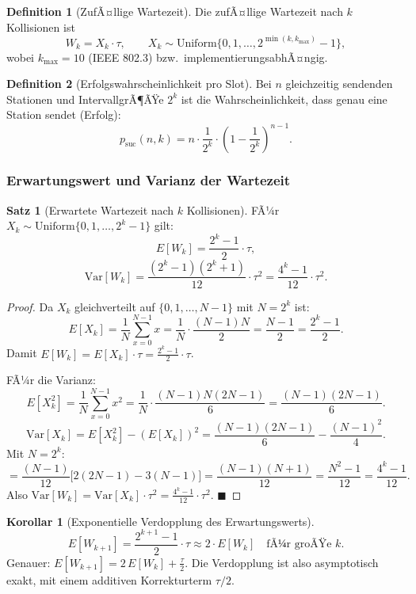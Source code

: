 ﻿\documentclass[a4paper,12pt]{article}
\theoremstyle{definition}
\newtheorem{definition}{Definition}
\newtheorem{satz}{Satz}
\newtheorem{korollar}{Korollar}
\begin{document}
\begin{definition}[ZufÃ¤llige Wartezeit]
Die zufÃ¤llige Wartezeit nach $k$ Kollisionen ist
\[
  W_k = X_k \cdot \tau, \qquad
  X_k \sim \mathrm{Uniform}\bigl\{0, 1, \ldots, 2^{\min(k,k_{\max})}-1\bigr\},
\]
wobei $k_{\max} = 10$ (IEEE 802.3) bzw.\ implementierungsabhÃ¤ngig.
\end{definition}

\begin{definition}[Erfolgswahrscheinlichkeit pro Slot]
Bei $n$ gleichzeitig sendenden Stationen und IntervallgrÃ¶ÃŸe $2^k$
ist die Wahrscheinlichkeit, dass genau eine Station sendet (Erfolg):
\[
  p_{\mathrm{suc}}(n, k) = n \cdot \frac{1}{2^k}
    \cdot \left(1 - \frac{1}{2^k}\right)^{n-1}.
\]
\end{definition}

\subsubsection{Erwartungswert und Varianz der Wartezeit}

\begin{satz}[Erwartete Wartezeit nach $k$ Kollisionen]
\label{satz:erwartung_backoff}
FÃ¼r $X_k \sim \mathrm{Uniform}\{0, 1, \ldots, 2^k - 1\}$ gilt:
\[
  E[W_k] = \frac{2^k - 1}{2} \cdot \tau,
\]
\[
  \mathrm{Var}[W_k] = \frac{(2^k - 1)(2^k + 1)}{12} \cdot \tau^2
                    = \frac{4^k - 1}{12} \cdot \tau^2.
\]
\end{satz}

\begin{proof}
Da $X_k$ gleichverteilt auf $\{0, 1, \ldots, N-1\}$ mit $N = 2^k$ ist:
\[
  E[X_k] = \frac{1}{N}\sum_{x=0}^{N-1} x
          = \frac{1}{N} \cdot \frac{(N-1)N}{2}
          = \frac{N-1}{2}
          = \frac{2^k - 1}{2}.
\]
Damit $E[W_k] = E[X_k] \cdot \tau = \frac{2^k-1}{2} \cdot \tau$.

FÃ¼r die Varianz:
\[
  E[X_k^2] = \frac{1}{N}\sum_{x=0}^{N-1} x^2
            = \frac{1}{N} \cdot \frac{(N-1)N(2N-1)}{6}
            = \frac{(N-1)(2N-1)}{6}.
\]
\[
  \mathrm{Var}[X_k]
  = E[X_k^2] - (E[X_k])^2
  = \frac{(N-1)(2N-1)}{6} - \frac{(N-1)^2}{4}.
\]
Mit $N = 2^k$:
\[
  = \frac{(N-1)}{12}\bigl[2(2N-1) - 3(N-1)\bigr]
  = \frac{(N-1)(N+1)}{12}
  = \frac{N^2 - 1}{12}
  = \frac{4^k - 1}{12}.
\]
Also $\mathrm{Var}[W_k] = \mathrm{Var}[X_k] \cdot \tau^2 = \frac{4^k-1}{12} \cdot \tau^2$.
\hfill$\blacksquare$
\end{proof}

\begin{korollar}[Exponentielle Verdopplung des Erwartungswerts]
\[
  E[W_{k+1}] = \frac{2^{k+1}-1}{2}\cdot\tau
             \approx 2 \cdot E[W_k] \quad \text{fÃ¼r groÃŸe } k.
\]
Genauer: $E[W_{k+1}] = 2\,E[W_k] + \tfrac{\tau}{2}$.
Die Verdopplung ist also asymptotisch exakt, mit einem additiven
Korrekturterm $\tau/2$.
\end{korollar}
\end{document}
